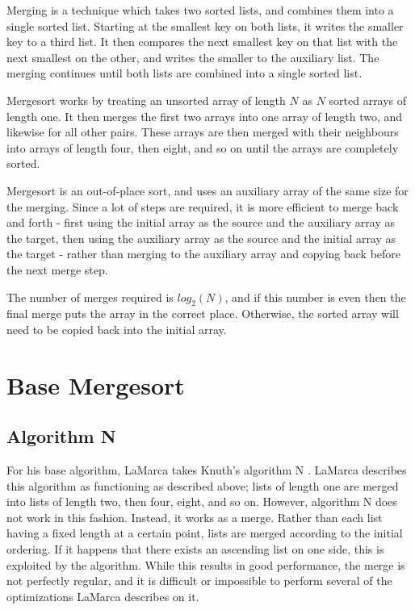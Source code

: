 \label{merge}
Merging is a technique which takes two sorted lists, and combines them into a
single sorted list. Starting at the smallest key on both lists, it writes the
smaller key to a third list. It then compares the next smallest key on that list
with the next smallest on the other, and writes the smaller to the auxiliary
list. The merging continues until both lists are combined into a single sorted
list.

Mergesort works by treating an unsorted array of length $N$ as $N$ sorted arrays of
length one. It then merges the first two arrays into one array of length two, and
likewise for all other pairs. These arrays are then merged with their neighbours
into arrays of length four, then eight, and so on until the arrays are
completely sorted.

Mergesort is an out-of-place sort, and uses an auxiliary array of the same size
for the merging. Since a lot of steps are required, it is more efficient to
merge back and forth - first using the initial array as the source and the
auxiliary array as the target, then using the auxiliary array as the source and
the initial array as the target - rather than merging to the auxiliary array and
copying back before the next merge step.

The number of merges required is $log_2(N)$, and if this number is even then the
final merge puts the array in the correct place. Otherwise, the sorted array
will need to be copied back into the initial array.

\section{Base Mergesort}

\subsection{Algorithm N}
\label{Algorithm N}

For his base algorithm, LaMarca takes Knuth's algorithm N \cite{Knuth98}.
LaMarca describes this algorithm as functioning as described above; lists of
length one are merged into lists of length two, then four, eight, and so on.
However, algorithm N does not work in this fashion. Instead, it works as a
 merge. Rather than each list having a fixed length at a certain
point, lists are merged according to the initial ordering. If it happens that
there exists an ascending list on one side, this is exploited by the algorithm.
While this results in good performance, the merge is not perfectly regular, and
it is difficult or impossible to perform several of the optimizations LaMarca
describes on it.

